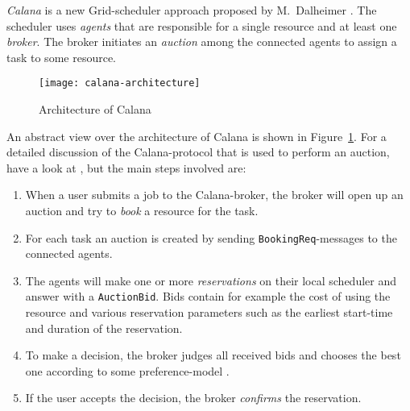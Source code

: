 \emph{Calana} is  a new  Grid-scheduler approach proposed  by M.~Dalheimer
\cite{dalheimer05agentbased}.  The  scheduler uses \emph{agents}  that are
responsible for  a single  resource and at  least one  \emph{broker}.  The
broker initiates an \emph{auction} among  the connected agents to assign a
task to some resource.

\begin{figure}[htbp]
  \centering
  \texttt{[image: calana-architecture]}
  \caption{Architecture of Calana}
  \label{fig:calana-architecture}
\end{figure}

An  abstract   view  over   the  architecture  of   Calana  is   shown  in
Figure~\ref{fig:calana-architecture}.   For a  detailed discussion  of the
Calana-protocol  that  is used  to  perform an  auction,  have  a look  at
\cite{dalheimer06calanaprotocol,petry06}, but  the  main steps  involved
are:
\begin{enumerate}
\item When a user submits a job to the Calana-broker, the broker will open
  up an auction and try to \emph{book} a resource for the task.
\item    For   each   task    an   auction    is   created    by   sending
  \texttt{BookingReq}-messages to the connected agents.
\item The agents will make  one or more \emph{reservations} on their local
  scheduler  and  answer with  a  \texttt{AuctionBid}.   Bids contain  for
  example  the  cost  of   using  the  resource  and  various  reservation
  parameters  such  as  the   earliest  start-time  and  duration  of  the
  reservation.
\item To make a decision, the  broker judges all received bids and chooses
  the     best     one      according     to     some     preference-model
  \cite{dalheimer05agentbased, petry06}.
\item If  the user  accepts the decision,  the broker  \emph{confirms} the
  reservation.
\end{enumerate}

